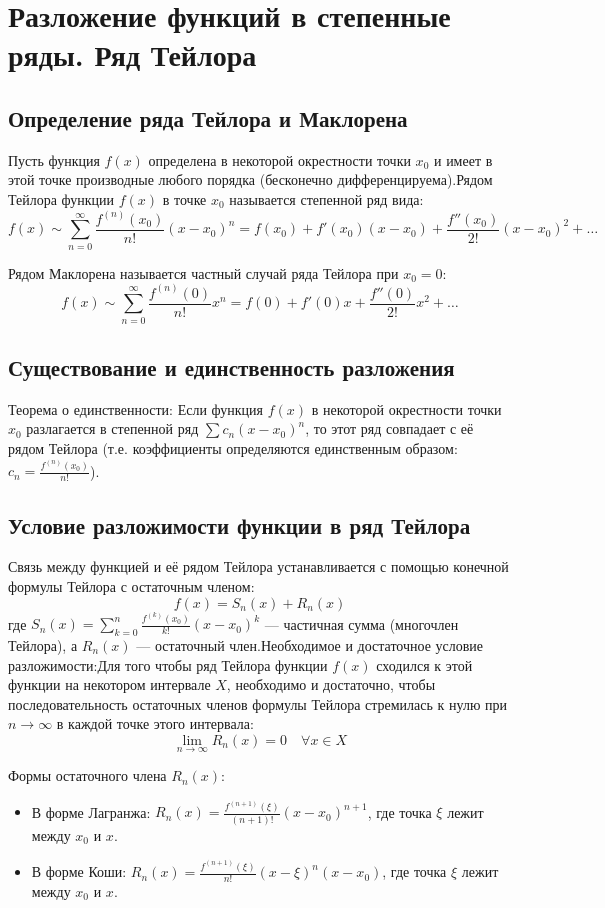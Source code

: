 \documentclass[14pt]{extreport}
\begin{document}
    \chapter{Разложение функций в степенные ряды. Ряд Тейлора}
    \section{Определение ряда Тейлора и Маклорена}
    Пусть функция $f(x)$ определена в некоторой окрестности точки $x_0$ и имеет в этой точке производные любого порядка (бесконечно дифференцируема).Рядом Тейлора функции $f(x)$ в точке $x_0$ называется степенной ряд вида:$$f(x) \sim \sum_{n=0}^{\infty} \frac{f^{(n)}(x_0)}{n!} (x - x_0)^n = f(x_0) + f'(x_0)(x - x_0) + \frac{f''(x_0)}{2!}(x - x_0)^2 + \dots$$

    Рядом Маклорена называется частный случай ряда Тейлора при $x_0 = 0$:$$f(x) \sim \sum_{n=0}^{\infty} \frac{f^{(n)}(0)}{n!} x^n = f(0) + f'(0)x + \frac{f''(0)}{2!}x^2 + \dots$$

    \section{Существование и единственность разложения}

    Теорема о единственности: Если функция $f(x)$ в некоторой окрестности точки $x_0$ разлагается в степенной ряд $\sum c_n(x-x_0)^n$, то этот ряд совпадает с её рядом Тейлора (т.е. коэффициенты определяются единственным образом: $c_n = \frac{f^{(n)}(x_0)}{n!}$).

    \section{Условие разложимости функции в ряд Тейлора}
    
    Связь между функцией и её рядом Тейлора устанавливается с помощью конечной формулы Тейлора с остаточным членом:$$f(x) = S_n(x) + R_n(x)$$где $S_n(x) = \sum_{k=0}^{n} \frac{f^{(k)}(x_0)}{k!} (x - x_0)^k$ — частичная сумма (многочлен Тейлора), а $R_n(x)$ — остаточный член.Необходимое и достаточное условие разложимости:Для того чтобы ряд Тейлора функции $f(x)$ сходился к этой функции на некотором интервале $X$, необходимо и достаточно, чтобы последовательность остаточных членов формулы Тейлора стремилась к нулю при $n \to \infty$ в каждой точке этого интервала:$$\lim_{n \to \infty} R_n(x) = 0 \quad \forall x \in X$$

    Формы остаточного члена $R_n(x)$:
    \begin{itemize}
        \item В форме Лагранжа: $R_n(x) = \frac{f^{(n+1)}(\xi)}{(n+1)!} (x - x_0)^{n+1}$, где точка $\xi$ лежит между $x_0$ и $x$.
        \item В форме Коши: $R_n(x) = \frac{f^{(n+1)}(\xi)}{n!} (x - \xi)^n (x - x_0)$, где точка $\xi$ лежит между $x_0$ и $x$.
    \end{itemize}
\end{document}
